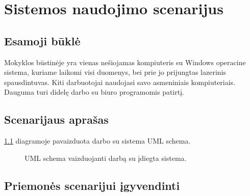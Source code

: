\chapter{Sistemos naudojimo scenarijus}

\section{Esamoji būklė}

Mokyklos būstinėje yra vienas nešiojamas kompiuteris su Windows operacine
sistema, kuriame laikomi visi duomenys, bei prie jo prijungtas lazerinis
spausdintuvas. Kiti darbuotojai naudojasi savo asmeniniais kompiuteriais.
Dauguma turi didelę darbo su biuro programomis patirtį.

\section{Scenarijaus aprašas}

\ref{fig:uml_usecase} diagramoje pavaizduota darbo su sistema UML schema.

\begin{figure}[htb]
  \begin{center}
  \end{center}
  \caption{UML schema vaizduojanti darbą su įdiegta sistema.}
  \label{fig:uml_usecase}
\end{figure}

\section{Priemonės scenarijui įgyvendinti}
